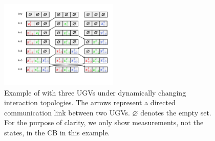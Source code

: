 	
	\begin{figure}%
		\centering
		\includegraphics[width=0.5\textwidth]{figures/fifo}
		\caption{Example of {\proto} with three UGVs under dynamically changing interaction topologies. The arrows represent a directed communication link between two UGVs. $\varnothing$ denotes the empty set. For the purpose of clarity, we only show measurements, not the states, in the CB in this example.}
		\label{fig:\proto}
	\end{figure}		